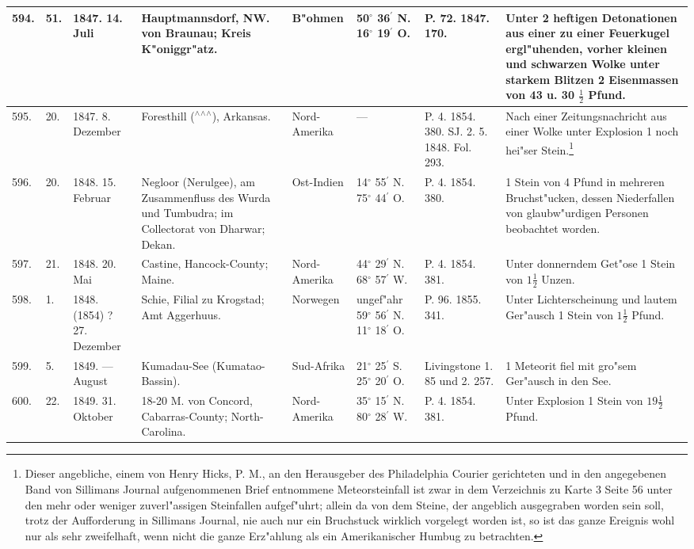\documentclass[a4paper, 8pt, oneside, polutonikogreek, german]{article}
\begin{document}
\begin{center}
\begin{longtable}{| p{4mm} | p{2mm} | p{15mm} | p{25mm} | p{16mm} | p{12mm} | p{13mm} | p{20mm} |}
        594. & 51. & 1847. 14. Juli & Hauptmannsdorf, NW. von Braunau; Kreis K"oniggr"atz. & B"ohmen & 50$^\circ$ 36$^\prime$ N. 16$^\circ$ 19$^\prime$ O. & P. 72. 1847. 170. & Unter 2 heftigen Detonationen aus einer zu einer Feuerkugel ergl"uhenden, vorher kleinen und schwarzen Wolke unter starkem Blitzen 2 Eisenmassen von 43 u. 30 $\frac{1}{2}$ Pfund. \\ \hline
        595. & 20. & 1847. 8. Dezember & Foresthill ($^\wedge$$^\wedge$$^\wedge$), Arkansas. & Nord-Amerika & --- & P. 4. 1854. 380. SJ. 2. 5. 1848. Fol. 293. & Nach einer Zeitungsnachricht aus einer Wolke unter Explosion 1 noch hei"ser Stein.\footnote{Dieser angebliche, einem von Henry Hicks, P. M., an den Herausgeber des Philadelphia Courier gerichteten und in den angegebenen Band von Sillimans Journal aufgenommenen Brief entnommene Meteorsteinfall ist zwar in dem Verzeichnis zu Karte 3 Seite 56 unter den mehr oder weniger zuverl"assigen Steinfallen aufgef"uhrt; allein da von dem Steine, der angeblich ausgegraben worden sein soll, trotz der Aufforderung in Sillimans Journal, nie auch nur ein Bruchstuck wirklich vorgelegt worden ist, so ist das ganze Ereignis wohl nur als sehr zweifelhaft, wenn nicht die ganze Erz"ahlung als ein Amerikanischer Humbug zu betrachten.} \\ \hline
        596. & 20. & 1848. 15. Februar & Negloor (Nerulgee), am Zusammenfluss des Wurda und Tumbudra; im Collectorat von Dharwar; Dekan. & Ost-Indien & 14$^\circ$ 55$^\prime$ N. 75$^\circ$ 44$^\prime$ O. & P. 4. 1854. 380. & 1 Stein von 4 Pfund in mehreren Bruchst"ucken, dessen Niederfallen von glaubw"urdigen Personen beobachtet worden. \\ \hline
        597. & 21. & 1848. 20. Mai & Castine, Hancock-County; Maine. & Nord-Amerika & 44$^\circ$ 29$^\prime$ N. 68$^\circ$ 57$^\prime$ W. & P. 4. 1854. 381. & Unter donnerndem Get"ose 1 Stein von $1\frac{1}{2}$ Unzen. \\ \hline
        598. & 1. & 1848. (1854) ? 27. Dezember & Schie, Filial zu Krogstad; Amt Aggerhuus. & Norwegen & ungef"ahr 59$^\circ$ 56$^\prime$ N. 11$^\circ$ 18$^\prime$ O. & P. 96. 1855. 341. & Unter Lichterscheinung und lautem Ger"ausch 1 Stein von $1\frac{1}{2}$ Pfund. \\ \hline
        599. & 5. & 1849. --- August & Kumadau-See (Kumatao-Bassin). & Sud-Afrika & 21$^\circ$ 25$^\prime$ S. 25$^\circ$ 20$^\prime$ O. & Livingstone 1. 85 und 2. 257. & 1 Meteorit fiel mit gro"sem Ger"ausch in den See. \\ \hline
        600. & 22. & 1849. 31. Oktober & 18-20 M. von Concord, Cabarras-County; North-Carolina. & Nord-Amerika & 35$^\circ$ 15$^\prime$ N. 80$^\circ$ 28$^\prime$ W. & P. 4. 1854. 381. & Unter Explosion 1 Stein von $19\frac{1}{2}$ Pfund. \\ \hline

\end{longtable}
\end{center}
\end{document}
